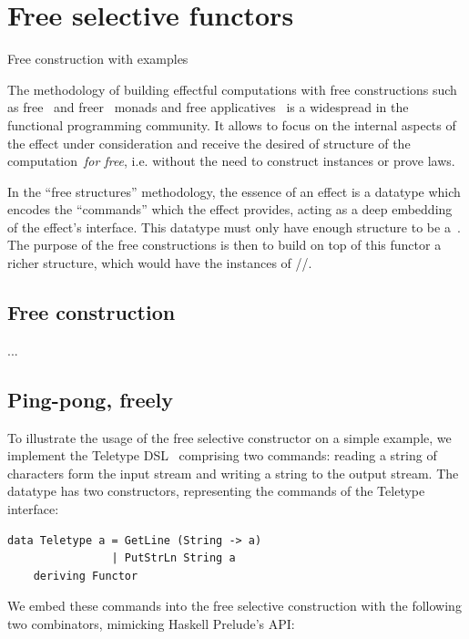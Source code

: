 \section{Free selective functors}\label{sec-free}

Free construction with examples

The methodology of building effectful computations with free constructions such
as free~\cite{swierstra2008data} and freer~\cite{kiselyov2015freer} monads and free
applicatives~\cite{free-applicatives} is a widespread in the functional programming community.
It allows to focus on the internal aspects of the effect under consideration and receive the
desired  of  structure of the computation~\emph{for free},
i.e. without the need to construct instances or prove laws.

In the ``free structures'' methodology, the essence of an effect is a datatype which encodes
the ``commands'' which the effect provides, acting as a deep embedding of the effect's
interface. This datatype must only have enough structure to be a~. The purpose of
the free constructions is then to build on top of this functor a richer structure,
which would have the instances of //.

\subsection{Free construction}\label{sec-free-construction}

...

\subsection{Ping-pong, freely}\label{sec-free-ping-pong}

To illustrate the usage of the free selective constructor on a simple example, we implement the
Teletype DSL~\cite{swierstra2008data} comprising two commands: reading a string of characters
form the input stream and writing a string to the output stream. The  datatype
has two constructors, representing the commands of the Teletype interface:

\begin{verbatim}
data Teletype a = GetLine (String -> a)
                | PutStrLn String a
    deriving Functor
\end{verbatim}

We embed these commands into the free selective construction with the following two combinators,
mimicking Haskell Prelude's  API:

